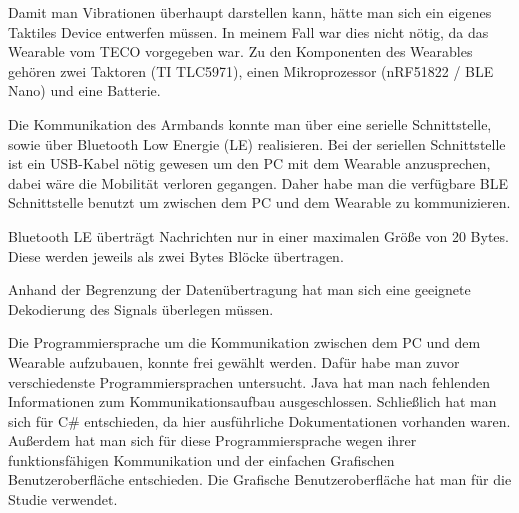 Damit man Vibrationen {\"u}berhaupt darstellen kann, h{\"a}tte man sich ein eigenes Taktiles Device entwerfen m{\"u}ssen. In meinem Fall war dies nicht n{\"o}tig, da das Wearable vom TECO vorgegeben war. Zu den Komponenten des Wearables geh{\"o}ren zwei Taktoren (TI TLC5971), einen Mikroprozessor (nRF51822 / BLE Nano) und eine Batterie.

Die Kommunikation des Armbands konnte man {\"u}ber eine serielle Schnittstelle, sowie {\"u}ber Bluetooth Low Energie (LE) realisieren.
Bei der seriellen Schnittstelle ist ein USB-Kabel n{\"o}tig gewesen um den PC mit dem Wearable anzusprechen, dabei w{\"a}re die Mobilit{\"a}t verloren gegangen. Daher habe man die verf{\"u}gbare BLE Schnittstelle benutzt um zwischen dem PC und dem Wearable zu kommunizieren. 

Bluetooth LE {\"u}bertr{\"a}gt Nachrichten nur in einer maximalen Gr{\"o}{\ss}e von 20 Bytes. Diese werden jeweils als zwei Bytes Bl{\"o}cke {\"u}bertragen. 

Anhand der Begrenzung der Daten{\"u}bertragung hat man sich eine geeignete Dekodierung des Signals {\"u}berlegen m{\"u}ssen. 

Die Programmiersprache um die Kommunikation zwischen dem PC und dem Wearable aufzubauen, konnte frei gew{\"a}hlt werden. 
Daf{\"u}r habe man zuvor verschiedenste Programmiersprachen untersucht. 
Java hat man nach fehlenden Informationen zum Kommunikationsaufbau ausgeschlossen.
Schlie{\ss}lich hat man sich f{\"u}r C\# entschieden, da hier ausf{\"u}hrliche Dokumentationen vorhanden waren.
Außerdem hat man sich f{\"u}r diese Programmiersprache wegen ihrer funktionsf{\"a}higen Kommunikation und der einfachen Grafischen Benutzeroberfl{\"a}che entschieden. 
Die Grafische Benutzeroberfl{\"a}che hat man f{\"u}r die Studie verwendet.

